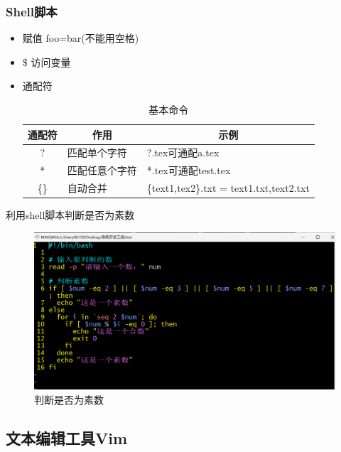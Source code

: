 \documentclass[a4paper,12pt]{article}
\begin{document}
\subsubsection{\color{green}Shell脚本}

\begin{itemize}
    \item 赋值 foo=bar(不能用空格)
    \item \$ 访问变量
    \item 通配符
        \begin{table}[h]
            \centering
            \caption{基本命令}
            \begin{tabular}{c|l|l} 
            \hline
            \multicolumn{1}{l|}{通配符} & \multicolumn{1}{c|}{作用} & \multicolumn{1}{c}{示例}                    \\ 
            \hline
            ?                        & 匹配单个字符                  & ?.tex可通配a.tex                             \\
            *                        & 匹配任意个字符                 & *.tex可通配test.tex                          \\
            \{\}                     & 自动合并                    & \{text1,tex2\}.txt = text1.txt,text2.txt 
            \end{tabular}
        \end{table}
\end{itemize}
利用shell脚本判断是否为素数
\begin{figure}[h]
    \centering
    \includegraphics[width=1\textwidth]{shell.png}
    \caption{判断是否为素数}
\end{figure}



\subsection{\color{red}文本编辑工具Vim}
\end{document}
